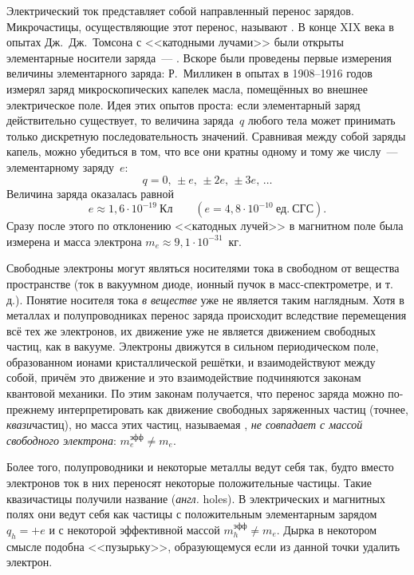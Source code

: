 Электрический ток представляет собой направленный перенос зарядов. Микрочастицы,
осуществляющие этот перенос, называют . В конце
XIX века в опытах Дж.~Дж.~Томсона с <<катодными лучами>> были открыты
элементарные носители заряда~--- . Вскоре были проведены
первые измерения величины элементарного заряда: Р.~Милликен
в опытах в 1908--1916 годов измерял заряд микроскопических капелек масла,
помещённых во внешнее электрическое поле. Идея этих опытов проста:
если элементарный заряд действительно существует, то величина заряда~$q$
любого тела может принимать только дискретную последовательность значений.
Сравнивая между собой заряды капель, можно убедиться в том, что все они
кратны одному и тому же числу~--- элементарному заряду~$e$:
\begin{equation*}
    q = 0,\,\pm e,\,\pm2e,\,\pm3e,\, \ldots
\end{equation*}
Величина заряда оказалась равной
\[
e\approx1,6\cdot 10^{-19}~Кл\qquad (e=4,8\cdot 10^{-10}~ед.~СГС).
\]
Сразу после этого по отклонению <<катодных лучей>> в магнитном поле была
измерена и масса электрона $m_e\approx 9,1\cdot 10^{-31}$~кг.

Свободные электроны могут являться носителями тока в свободном от вещества
пространстве (ток в вакуумном диоде, ионный пучок в масс-спектрометре, и
т.\,д.). Понятие носителя тока \emph{в веществе} уже не является таким
наглядным. Хотя в металлах и полупроводниках перенос заряда происходит
вследствие перемещения всё тех же электронов, их движение уже не является
движением свободных частиц, как в вакууме. Электроны движутся в сильном
периодическом поле, образованном ионами кристаллической решётки, и
взаимодействуют между собой, причём это движение и это взаимодействие
подчиняются законам квантовой механики. По этим законам получается, что перенос
заряда можно по-прежнему интерпретировать как движение свободных заряженных
частиц (точнее, \emph{квази}частиц), но масса этих частиц, называемая
, \emph{не совпадает с массой свободного
электрона}: $m_{e}^{эфф}\ne m_e$.

Более того, полупроводники и некоторые металлы
ведут себя так, будто вместо электронов ток в них переносят некоторые
положительные частицы. Такие квазичастицы получили название 
(\emph{англ.} holes).
В электрических и магнитных полях они ведут себя как частицы с положительным
элементарным зарядом $q_h=+e$ и с некоторой эффективной массой
$m_h^{эфф}\ne m_e$. Дырка в некотором смысле подобна <<пузырьку>>, образующемуся
если из данной точки удалить электрон.

